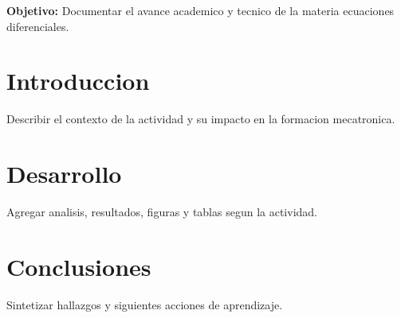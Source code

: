 \documentclass[spanish,letterpaper,oneside]{article}
\begin{document}
\templatePortrait
\templatePagecfg
\onehalfspacing

\begin{abstractd}
\textbf{Objetivo:} Documentar el avance academico y tecnico de la materia ecuaciones diferenciales.
\end{abstractd}

\templateIndex
\templateFinalcfg

\section{Introduccion}
Describir el contexto de la actividad y su impacto en la formacion mecatronica.

\section{Desarrollo}
Agregar analisis, resultados, figuras y tablas segun la actividad.

\section{Conclusiones}
Sintetizar hallazgos y siguientes acciones de aprendizaje.



\end{document}
